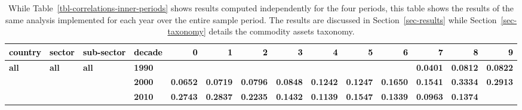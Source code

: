 \documentclass[
  authoryear,
  preprint,
  3p]{elsarticle}
\begin{document}
\begin{landscape}\begingroup\fontsize{7}{9}\selectfont

\begin{longtable}[t]{>{}l>{}l>{}l>{}l>{}r>{}r>{}r>{}r>{}r>{}r>{}r>{}r>{}r>{}r}

\caption{\label{tbl-correlations-inner-years}While
Table~\ref{tbl-correlations-inner-periods} shows results computed
independently for the four periods, this table shows the results of the
same analysis implemented for each year over the entire sample period.
The results are discussed in Section~\ref{sec-results} while
Section~\ref{sec-taxonomy} details the commodity assets taxonomy.}

\tabularnewline

\toprule
\textcolor{black}{\textbf{country}} & \textcolor{black}{\textbf{sector}} & \textcolor{black}{\textbf{sub-sector}} & \textcolor{black}{\textbf{decade}} & \textcolor{black}{\textbf{0}} & \textcolor{black}{\textbf{1}} & \textcolor{black}{\textbf{2}} & \textcolor{black}{\textbf{3}} & \textcolor{black}{\textbf{4}} & \textcolor{black}{\textbf{5}} & \textcolor{black}{\textbf{6}} & \textcolor{black}{\textbf{7}} & \textcolor{black}{\textbf{8}} & \textcolor{black}{\textbf{9}}\\
\midrule
\textbf{all} & \textbf{all} & \textbf{all} & \textbf{1990} & \textcolor[HTML]{4285f4}{\textbf{}} & \textcolor[HTML]{4285f4}{\textbf{}} & \textcolor[HTML]{4285f4}{\textbf{}} & \textcolor[HTML]{4285f4}{\textbf{}} & \textcolor[HTML]{4285f4}{\textbf{}} & \textcolor[HTML]{4285f4}{\textbf{}} & \textcolor[HTML]{4285f4}{\textbf{}} & \textcolor[HTML]{4285f4}{\textbf{0.0401}} & \textcolor[HTML]{4285f4}{\textbf{0.0812}} & \textcolor[HTML]{4285f4}{\textbf{0.0822}}\\
\textbf{} & \textbf{} & \textbf{} & \textbf{2000} & \textcolor[HTML]{4285f4}{\textbf{0.0652}} & \textcolor[HTML]{4285f4}{\textbf{0.0719}} & \textcolor[HTML]{4285f4}{\textbf{0.0796}} & \textcolor[HTML]{4285f4}{\textbf{0.0848}} & \textcolor[HTML]{4285f4}{\textbf{0.1242}} & \textcolor[HTML]{4285f4}{\textbf{0.1247}} & \textcolor[HTML]{4285f4}{\textbf{0.1650}} & \textcolor[HTML]{4285f4}{\textbf{0.1541}} & \textcolor[HTML]{4285f4}{\textbf{0.3334}} & \textcolor[HTML]{4285f4}{\textbf{0.2913}}\\
\textbf{} & \textbf{} & \textbf{} & \textbf{2010} & \textcolor[HTML]{4285f4}{\textbf{0.2743}} & \textcolor[HTML]{4285f4}{\textbf{0.2837}} & \textcolor[HTML]{4285f4}{\textbf{0.2235}} & \textcolor[HTML]{4285f4}{\textbf{0.1432}} & \textcolor[HTML]{4285f4}{\textbf{0.1139}} & \textcolor[HTML]{4285f4}{\textbf{0.1547}} & \textcolor[HTML]{4285f4}{\textbf{0.1339}} & \textcolor[HTML]{4285f4}{\textbf{0.0963}} & \textcolor[HTML]{4285f4}{\textbf{0.1374}} & \textcolor[HTML]{4285f4}{\textbf{}}\\

\end{longtable}
\end{landscape}
\end{document}
